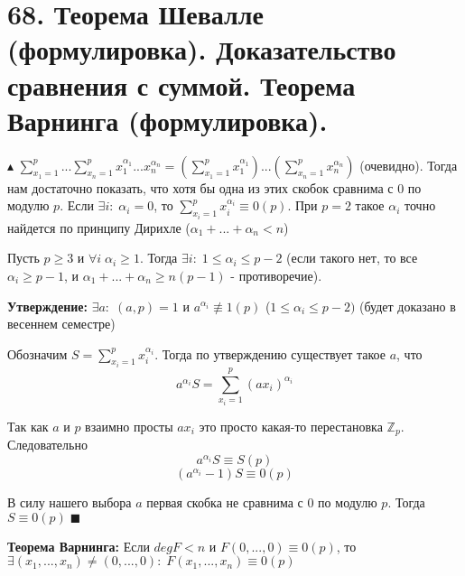 \section*{68. Теорема Шевалле (формулировка). Доказательство сравнения с суммой. Теорема Варнинга (формулировка).}
\par $\blacktriangle$ $\sum\limits_{x_1=1}^p...\sum\limits_{x_n=1}^px_1^{\alpha_1}...x_n^{\alpha_n} = \left(\sum\limits_{x_1=1}^px_1^{\alpha_1}\right)...\left(\sum\limits_{x_n=1}^px_n^{\alpha_n}\right)$ (очевидно). Тогда нам достаточно показать, что хотя бы одна из этих скобок сравнима с 0 по модулю $p$. Если $\exists i: \; \alpha_i = 0$, то $\sum\limits_{x_i=1}^px_i^{\alpha_i} \equiv 0(p)$. При $p=2$ такое $\alpha_i$ точно найдется по принципу Дирихле ($\alpha_1 + ...+\alpha_n < n$)
\par Пусть $p \geq 3$ и $\forall i \; \alpha_i \geq 1$. Тогда $\exists i: \; 1 \leq \alpha_i \leq p-2$ (если такого нет, то все $\alpha_i \geq p-1$, и $\alpha_1+...+\alpha_n \geq n(p-1)$ - противоречие).
\par \textbf{Утверждение: } $\exists a: \; (a,p)=1$ и $a^{\alpha_i} \not\equiv 1(p)$ ($1 \leq \alpha_i \leq p-2)$ (будет доказано в весеннем семестре)
\par Обозначим $S = \sum\limits_{x_i=1}^p x_i^{\alpha_i}$. Тогда по утверждению существует такое $a$, что
$$a^{\alpha_i}S=\sum_{x_i=1}^p (a x_i)^{\alpha_i}$$
\par Так как $a$ и $p$ взаимно просты $a x_i$ это просто какая-то перестановка $\mathbb{Z}_p$. Следовательно
$$a^{\alpha_i}S \equiv S (p)$$
$$(a^{\alpha_i}-1)S \equiv 0 (p)$$
\par В силу нашего выбора $a$ первая скобка не сравнима с 0 по модулю $p$. Тогда $S \equiv 0 (p) \; \blacksquare$ 
\par \textbf{Теорема Варнинга: } Если $deg F < n$ и $F(0, ..., 0) \equiv 0(p)$, то $\exists(x_1, ..., x_n) \neq (0, ..., 0): \; F(x_1, ..., x_n) \equiv 0 (p)$

